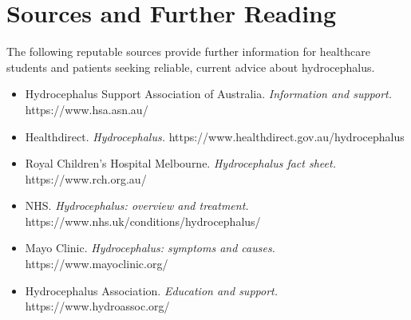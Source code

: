 \section*{Sources and Further Reading}
The following reputable sources provide further information for healthcare students and patients seeking reliable, current advice about hydrocephalus.

\begin{itemize}
    \item Hydrocephalus Support Association of Australia. \textit{Information and support.} https://www.hsa.asn.au/
    \item Healthdirect. \textit{Hydrocephalus.} https://www.healthdirect.gov.au/hydrocephalus
    \item Royal Children's Hospital Melbourne. \textit{Hydrocephalus fact sheet.} https://www.rch.org.au/
    \item NHS. \textit{Hydrocephalus: overview and treatment.} https://www.nhs.uk/conditions/hydrocephalus/
    \item Mayo Clinic. \textit{Hydrocephalus: symptoms and causes.} https://www.mayoclinic.org/
    \item Hydrocephalus Association. \textit{Education and support.} https://www.hydroassoc.org/
\end{itemize}
